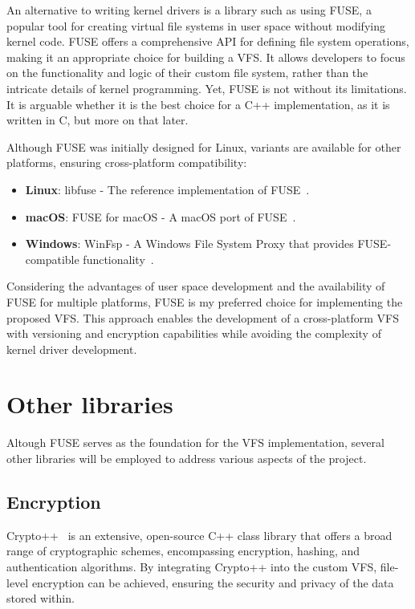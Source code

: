 An alternative to writing kernel drivers is a library such as using FUSE, a popular tool for creating virtual file systems in user space without modifying kernel code.
FUSE offers a comprehensive API for defining file system operations, making it an appropriate choice for building a VFS\@.
It allows developers to focus on the functionality and logic of their custom file system, rather than the intricate details of kernel programming.
Yet, FUSE is not without its limitations.
It is arguable whether it is the best choice for a C++ implementation, as it is written in C, but more on that later.

Although FUSE was initially designed for Linux, variants are available for other platforms, ensuring cross-platform compatibility:

\begin{itemize}
    \item \textbf{Linux}: libfuse - The reference implementation of FUSE~\cite{libfuse}.
    \item \textbf{macOS}: FUSE for macOS - A macOS port of FUSE~\cite{osxfuse}.
    \item \textbf{Windows}: WinFsp - A Windows File System Proxy that provides FUSE-compatible functionality~\cite{winfsp}.
\end{itemize}

Considering the advantages of user space development and the availability of FUSE for multiple platforms, FUSE is my preferred choice for implementing the proposed VFS\@.
This approach enables the development of a cross-platform VFS with versioning and encryption capabilities while avoiding the complexity of kernel driver development.

\section{Other libraries}\label{sec:other-libraries-analysis}

Altough FUSE serves as the foundation for the VFS implementation, several other libraries will be employed to address various aspects of the project.

\subsection{Encryption}\label{subsec:encryption-analysis}

Crypto++~\cite{crypto_pp} is an extensive, open-source C++ class library that offers a broad range of cryptographic schemes, encompassing encryption, hashing, and authentication algorithms.
By integrating Crypto++ into the custom VFS, file-level encryption can be achieved, ensuring the security and privacy of the data stored within.


